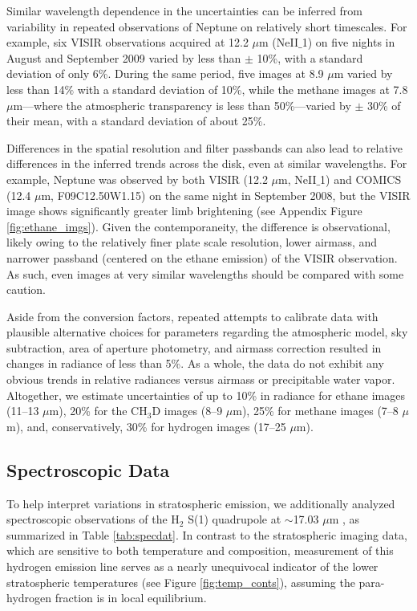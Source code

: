 \documentclass[twocolumn,10pt]{aastex631}
\begin{document}
Similar wavelength dependence in the uncertainties can be inferred from variability in repeated observations of Neptune on relatively short timescales. For example, six VISIR observations acquired at 12.2 $\mu$m (NeII$\_$1) on five nights in August and September 2009 varied by less than $\pm$ 10\%, with a standard deviation of only 6\%. During the same period, five images at 8.9 $\mu$m varied by less than 14$\%$ with a standard deviation of 10\%, while the methane images at 7.8 $\mu$m---where the atmospheric transparency is less than 50\%---varied by $\pm$ 30\% of their mean, with a standard deviation of about 25$\%$.  

Differences in the spatial resolution and filter passbands can also lead to relative differences in the inferred trends across the disk, even at similar wavelengths. For example, Neptune was observed by both VISIR (12.2 $\mu$m, NeII$\_$1) and COMICS (12.4 $\mu$m, F09C12.50W1.15) on the same night in September 2008, but the VISIR image shows significantly greater limb brightening (see Appendix Figure \ref{fig:ethane_imgs}).  Given the contemporaneity, the difference is observational, likely owing to the relatively finer plate scale resolution, lower airmass, and narrower passband (centered on the ethane emission) of the VISIR observation.  As such, even images at very similar wavelengths should be compared with some caution. 

Aside from the conversion factors, repeated attempts to calibrate data with plausible alternative choices for parameters regarding the atmospheric model, sky subtraction, area of aperture photometry, and airmass correction resulted in changes in radiance of less than 5\%.  As a whole, the data do not exhibit any obvious trends in relative radiances versus airmass or precipitable water vapor. Altogether, we estimate uncertainties of up to 10\% in radiance for ethane images (11--13 $\mu$m), 20\% for the CH$_3$D images (8--9 $\mu$m), 25\% for methane images (7--8 $\mu$m), and, conservatively, 30\% for hydrogen images (17--25 $\mu$m). 

\subsection{Spectroscopic Data}\label{sec:specdata}

To help interpret variations in stratospheric emission, we additionally analyzed spectroscopic observations of the H$_2$ S(1) quadrupole at $\sim$17.03 $\mu$m \citep{fletcher2018hydrogen}, as summarized in Table \ref{tab:specdat}. In contrast to the stratospheric imaging data, which are sensitive to both temperature and composition, measurement of this hydrogen emission line serves as a nearly unequivocal indicator of the lower stratospheric temperatures (see Figure \ref{fig:temp_conts}), assuming the para-hydrogen fraction is in local equilibrium. 
\end{document}
